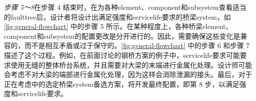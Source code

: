 \emph{步骤 5～8}\quad 在步骤 4 结束时，在为各种\gls*{element}、\gls*{component}和\gls*{subsystem}查看适当的\gls*{faulttree}后，设计者将设计出满足强度和\gls*{servicelife}要求的桥梁\gls*{system}，如\cref{fig:general-flowchart} 中的步骤 5 所示。在某种程度上，各种桥梁\gls*{element}、\gls*{component}和\gls*{subsystem}的配置更改是分开进行的。因此，需要确保这些变化是兼容的，而不是相互矛盾或过于保守的。\cref{fig:general-flowchart} 中的步骤 6 和步骤 7 描述了这个过程。例如，在前面讨论的钢桥方案的例子中，\gls*{servicelife}要求可能要求使用无缝的整体桥台系统，并且需要对大梁的末端进行金属化处理。设计师可能会考虑不对大梁的端部进行金属化处理，因为这样会消除泄漏的接头。最后，对于正在考虑中的选定桥梁\gls*{system}备选方案，将开发最终配置，即第 8 步，以满足强度和\gls*{servicelife}要求。

